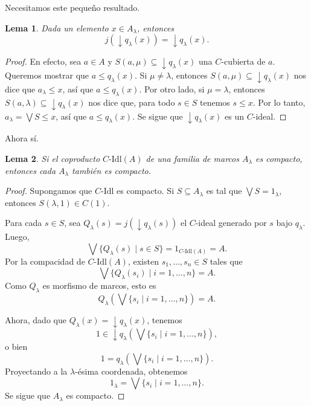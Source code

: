 \documentclass[12pt,letterpaper,titlepage]{article}
\newtheorem*{lemma}{Lema}
\theoremstyle{definition}
\newcommand\Sup{\bigvee}
\newcommand\down{{\downarrow}}
\newcommand\<{\langle}
\renewcommand\>{\rangle}
\newcommand\Idl{\text{-}\mathrm{Idl}}
\begin{document}
Necesitamos este pequeño resultado.
\begin{lemma}
Dada un elemento $x\in A_\lambda$, entonces
\[
    j(\down q_\lambda(x)) = \down q_\lambda(x)
.\]
\end{lemma}
\begin{proof}
    En efecto, sea $a\in A$ y $S(a,\mu)\subseteq\down q_\lambda(x)$
    una $C$-cubierta de $a$.
    Queremos mostrar que $a\leq q_\lambda(x)$.
    Si $\mu\neq\lambda$, entonces $S(a,\mu)\subseteq \down q_\lambda(x)$
    nos dice que $a_\lambda\leq x$, así que $a\leq q_\lambda(x)$.
    Por otro lado, si $\mu=\lambda$, entonces
    $S(a,\lambda) \subseteq \down q_\lambda(x)$ nos dice que, para todo
    $s\in S$ tenemos $s\leq x$.
    Por lo tanto, $a_\lambda=\Sup S\leq x$, así que $a\leq q_\lambda(x)$.
    Se sigue que $\down q_\lambda(x)$ es un $C$-ideal.
\end{proof}
Ahora sí.

\begin{lemma}
    Si el coproducto $C\Idl(A)$ de una familia de marcos
    $A_\lambda$ es compacto, entonces cada $A_\lambda$
    también es compacto.
\end{lemma}
\begin{proof}
    Supongamos que $C\Idl$ es compacto.
    Si $S\subseteq A_\lambda$ es tal que $\Sup S=1_\lambda$,
    entonces $S(\lambda,1)\in C(1)$.
    
    Para cada $s\in S$, sea $Q_\lambda(s)
    = j(\down q_\lambda(s))$
    el $C$-ideal generado por $s$ bajo $q_\lambda$.
    Luego,
    \[
        \Sup\{Q_\lambda(s) \mid s\in S\} = 1_{C\Idl(A)} = A
    .\]
    Por la compacidad de $C\Idl(A)$,
    existen $s_1,\dots,s_n\in S$ tales que
    \[
        \Sup\{Q_\lambda(s_i) \mid i=1,\dots,n\} = A
    .\]
    Como $Q_\lambda$ es morfismo de marcos, esto es
    \[
        Q_\lambda(\Sup\{s_i \mid i=1,\dots,n\}) = A
    .\]
    
    Ahora, dado que $Q_\lambda(x) = \down q_\lambda(x)$, tenemos
    \[
        1 \in \down q_\lambda(\Sup\{s_i \mid i=1,\dots,n\})
    ,\]
    o bien
    \[
        1 = q_\lambda(\Sup\{s_i \mid i=1,\dots,n\})
    .\]
    Proyectando a la $\lambda$-ésima coordenada, obtenemos
    \[
        1_\lambda = \Sup\{s_i \mid i=1,\dots,n\}
    .\]
    Se sigue que $A_\lambda$ es compacto.
\end{proof}
\end{document}

